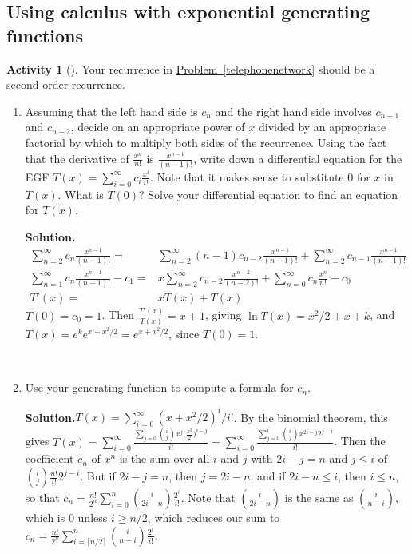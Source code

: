 \documentclass[10pt,]{book}
\theoremstyle{plain}
\theoremstyle{definition}
\newtheorem{activity}[project]{Activity}
\numberwithin{equation}{chapter}
\newcommand{\amp}{&}
\begin{document}
\typeout{************************************************}
\typeout{************************************************}
\subsection[{Using calculus  with exponential generating functions}]{Using calculus  with exponential generating functions}\label{subsection-78}
\begin{activity}[]\label{activity-365}
Your recurrence in \hyperref[telephonenetwork]{Problem~\ref{telephonenetwork}} should be a second order recurrence.%
~\par
\begin{enumerate}[label=(\alph*)]
 \item Assuming that the left hand side is \(c_n\) and the right hand side involves \(c_{n-1}\) and \(c_{n-2}\), decide on an appropriate power of \(x\) divided by an appropriate factorial by which to multiply both sides of the recurrence.  Using the fact that the derivative of \(\frac{x^n}{n!}\) is \(\frac{x^{n-1}}{(n-1)!}\), write down a differential equation for the EGF \(T(x) =
\sum_{i=0}^\infty c_i\frac{x^i}{i!}\).  Note that it makes sense to substitute 0 for \(x\) in \(T(x)\).  What is \(T(0)\)?  Solve your differential equation to find an equation for \(T(x)\).%
\par\medskip\noindent%
\textbf{Solution.}\quad %
\begin{align*}
\sum_{n=2}^\infty c_n\frac{x^{n-1}}{(n-1)!}
\! =\amp \!\sum_{n=2}^\infty(n-1) c_{n-2}\frac{x^{n-1}}{(n-1)!} +
\sum_{n=2}^\infty c_{n-1}\frac{x^{n-1}}{(n-1)!}\\
\sum_{n=1}^\infty c_n\frac{x^{n-1}}{(n-1)!}- c_1 \! =\amp \! x\sum_{n=2}^\infty
c_{n-2}\frac{x^{n-2}}{(n-2)!} + \sum_{n=0}^\infty c_n\frac{x^n}{n!} -c_0\\
T'(x)\! =\amp \!xT(x) +T(x)
\end{align*}
\(T(0) = c_0 =1\). Then \(\frac{T'(x)}{T(x)} = x+1\), giving \(\ln T(x)
=x^2/2+x+k\), and \(T(x) =e^ke^{x+ x^2/2}=e^{x+x^2/2}\), since \(T(0)=1\).%

~\par
\item Use your generating function to compute a formula for \(c_n\).%
\par\medskip\noindent%
\textbf{Solution.}\quad \(T(x) = \sum_{i=0}^\infty (x+x^2/2)^i/i!\). By the binomial theorem, this gives \(T(x) = \sum_{i=0}^\infty \frac{\sum_{j=0}^i \binom{i}{j}x^j\bigl(\frac{x^2}{2}\bigr)^{i-j}}{
i!}=\sum_{i=0}^\infty\frac{\sum_{j=0}^i\binom{i}{j}x^{2i-j}2^{j-i}}{i!}\). Then the coefficient \(c_n\) of \(x^n\) is the sum over all \(i\) and \(j\) with \(2i-j=n\) and \(j\le i\) of \(\binom{i}{j}\frac{n!}{i!}2^{j-i}\). But if \(2i-j=n\), then \(j= 2i-n\), and if \(2i-n\le i\), then \(i\le n\), so that \(c_n
= \frac{n!}{2^n}\sum_{i=0}^n\binom{i}{2i-n}\frac{2^i}{i!}\). Note that \(\binom{i}{2i-n}\) is the same as \(\binom{i}{n-i}\), which is 0 unless \(i\ge
n/2\), which reduces our sum to \(c_n = \frac{n!}{2^n}\sum_{i=\lceil n/2\rceil}^n\binom{i}{n-i}\frac{2^i}{i!}\).%

\end{enumerate}
\end{activity}
\end{document}
